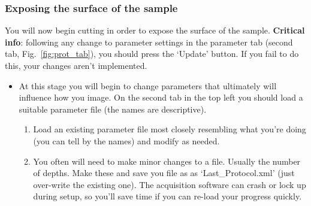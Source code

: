 \documentclass[paper=a4, fontsize=11pt]{scrartcl} %
\numberwithin{equation}{section} %
\numberwithin{figure}{section} %
\numberwithin{table}{section} %
\begin{document}
\subsubsection{Exposing the surface of the sample}
You will now begin cutting in order to expose the surface of the sample. 
\textbf{Critical info}: following any change to parameter settings in the parameter tab (second tab, Fig.~\ref{fig:prot_tab}), you should press the `Update' button. 
If you fail to do this, your changes aren't implemented.

\begin{itemize}
\item At this stage you will begin to change parameters that ultimately will influence how you image. 
On the second tab in the top left you should load a suitable parameter file (the names are descriptive).

\begin{enumerate}
\item Load an existing parameter file most closely resembling what you're doing (you can tell by the names) and modify as needed.
\item You often will need to make minor changes to a file. 
Usually the number of depths. 
Make these and save you file as as `Last\_Protocol.xml' (just over-write the existing one). 
The acquisition software can crash or lock up during setup, so you'll save time if you can re-load your progress quickly.


\end{enumerate}
\end{itemize}
\end{document}

